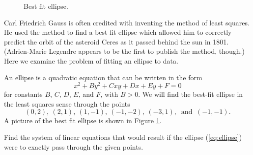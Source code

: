 \begin{figure}[ht]
\begin{center}
\caption{Best fit ellipse.}
\label{F:ellipse}
\end{center}
\end{figure}

\begin{pactivity} Carl Friedrich Gauss is often credited with inventing the method of least squares. He used the method to find a best-fit ellipse which allowed him to correctly predict the orbit of the asteroid Ceres as it passed behind the sun in 1801. (Adrien-Marie Legendre appears to be the first to publish the method, though.) Here we examine the problem of fitting an ellipse to data. 

An ellipse is a quadratic equation that can be written in the form 
\begin{equation} \label{eq:ellipse} 
x^2 + By^2 + Cxy + Dx + Ey + F = 0
\end{equation}
for constants $B$, $C$, $D$, $E$, and $F$, with $B > 0$. We will find the best-fit ellipse in the least squares sense through the points 
\[(0,2), \ (2,1), \ (1, -1), \ (-1, -2), \ (-3,1), \ \text{ and } \ (-1, -1).\]
A picture of the best fit ellipse is shown in Figure \ref{F:ellipse}.

\ba
\item Find the system of linear equations that would result if the ellipse (\ref{eq:ellipse}) were to exactly pass through the given points. 

\begin{comment}

\vs

\solution If these points were to lie on an ellipse whose equation has the given form, then we have the resulting system of equations
\begin{alignat*}{7}
{0} 	&{}+{}   &{4}B 	&{}{} 		&{}		&{}{}		&{}		&{}+{}	&{2}E	&{}+{}	&{}F	&{}={} 	&0&{}  \\
{4} 	&{}+{} &{}B 	&{}+{} 	&{2}C	&{}+{}	&{2}D	&{}+{}	&{}E		&{}+{}	&{}F	&{}={} 	&0&{}  \\
{1} 	&{}+{} &{}B 	&{}-{} 	&{}C		&{}+{}	&{}D		&{}-{}	&{}E		&{}+{}	&{}F	&{}={} 	&0&{}  \\
{1} 	&{}+{} &{4}B 	&{}+{} 	&{2}C	&{}-{}	&{}D		&{}-{}	&{2}E	&{}+{}	&{}F	&{}={} 	&0&{}  \\
{9} 	&{}+{} &{}B 	&{}-{} 	&{3}C	&{}-{}	&{3}D	&{}+{}	&{}E		&{}+{}	&{}F	&{}={} 	&0&{}  \\
{1} 	&{}+{} &{}B 	&{}+{} 	&{}C		&{}-{}	&{}D		&{}-{}	&{}E		&{}+{}	&{}F	&{}={} 	&0&{.} 
\end{alignat*}


\end{comment}
\end{pactivity}
